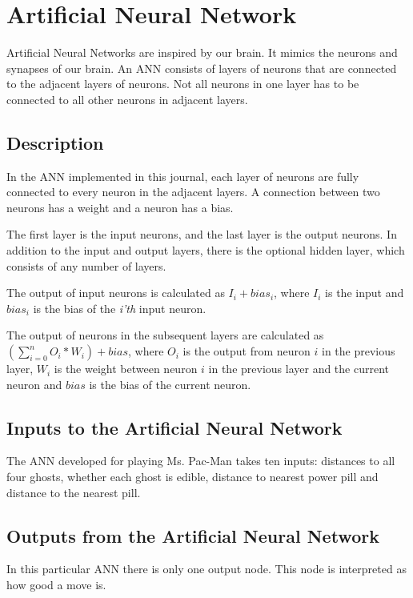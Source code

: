 
\section{Artificial Neural Network}
Artificial Neural Networks are inspired by our brain. It mimics the neurons and synapses of our brain. An ANN consists of layers of neurons that are connected to the adjacent layers of neurons. Not all neurons in one layer has to be connected to all other neurons in adjacent layers.

\subsection{Description}
In the ANN implemented in this journal, each layer of neurons are fully connected to every neuron in the adjacent layers. A connection between two neurons has a weight and a neuron has a bias. 

The first layer is the input neurons, and the last layer is the output neurons. In addition to the input and output layers, there is the optional hidden layer, which consists of any number of layers.

The output of input neurons is calculated as $ I_i + bias_i $, where $I_i$ is the input and $bias_i$ is the bias of the \textit{i'th} input neuron.

The output of neurons in the subsequent layers are calculated as $ \left( \displaystyle \sum_{i = 0}^{n} O_i * W_i \right) + bias $, where $O_i$ is the output from neuron $i$ in the previous layer, $W_i$ is the weight between neuron $i$ in the previous layer and the current neuron and $bias$ is the bias of the current neuron.

\subsection{Inputs to the Artificial Neural Network}
\label{subsub:ann_inputs}
The ANN developed for playing Ms. Pac-Man takes ten inputs: distances to all four ghosts, whether each ghost is edible, distance to nearest power pill and distance to the nearest pill.

\subsection{Outputs from the Artificial Neural Network}
\label{subsub:ann_outputs}
In this particular ANN there is only one output node. This node is interpreted as how good a move is.

